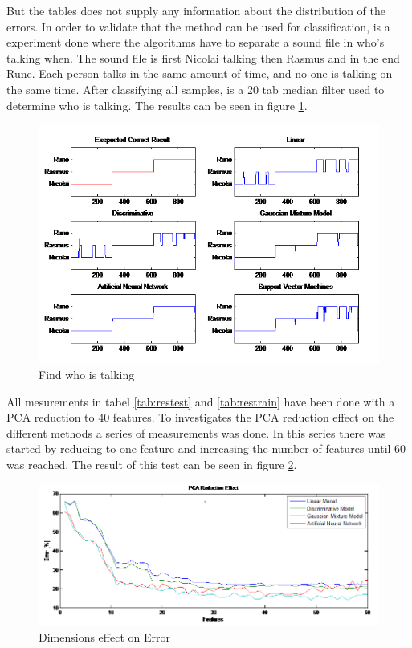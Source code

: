 But the tables does not supply any information about the distribution of the errors. In order to validate that the method can be used for classification, is a experiment done where the algorithms have to separate a sound file in who's talking when. The sound file is first Nicolai talking then Rasmus and in the end Rune. Each person talks in the same amount of time, and no one is talking on the same time.  After classifying all samples, is a 20 tab median filter used to determine who is talking. The results can be seen in figure \ref{fig:talktest}. 

\begin{figure}[H]
\centering
\includegraphics[scale=0.9]{billeder/TestedMethods}
\caption{ Find who is talking }
\label{fig:talktest}
\end{figure}

All mesurements in tabel \ref{tab:restest} and \ref{tab:restrain} have been done with a PCA reduction to 40 features. To investigates the PCA reduction effect on the different methods a series of measurements was done. In this series there was started by reducing to one feature and increasing the number of features until 60 was reached. The result of this test can be seen in figure \ref{fig:DimError}.

\begin{figure}[H]
\centering
\includegraphics[scale=0.7]{billeder/PCAReductionEffect}
\caption{ Dimensions effect on Error }
\label{fig:DimError}
\end{figure}

